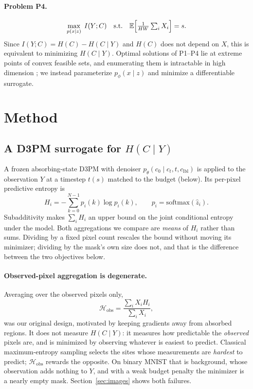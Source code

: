 \documentclass{article}
\begin{document}
\paragraph{Problem P4.}
\begin{equation}
\max_{p(x \mid z)} \; I(Y; C) \quad \text{s.t.} \quad \mathbb{E}\Bigl[\tfrac{1}{HW}\textstyle\sum_i X_i\Bigr] = s.
\label{eq:p4}
\end{equation}
Since $I(Y;C) = H(C) - H(C \mid Y)$ and $H(C)$ does not depend on $X$, this is equivalent to minimizing $H(C \mid Y)$. Optimal solutions of P1--P4 lie at extreme points of convex feasible sets, and enumerating them is intractable in high dimension \citep{vuong2025cnc}; we instead parameterize $p_\phi(x \mid z)$ and minimize a differentiable surrogate.

\section{Method}
\label{sec:method}

\subsection{A D3PM surrogate for $H(C \mid Y)$}
A frozen absorbing-state D3PM with denoiser $p_\theta(c_0 \mid c_t, t, c_{\mathrm{lbl}})$ is applied to the observation $Y$ at a timestep $t(s)$ matched to the budget (below). Its per-pixel predictive entropy is
\begin{equation}
H_i = -\sum_{k=0}^{N-1} p_i(k) \log p_i(k), \qquad p_i = \mathrm{softmax}(\hat{z}_i).
\end{equation}
Subadditivity makes $\sum_i H_i$ an upper bound on the joint conditional entropy under the model. Both aggregations we compare are \emph{means} of $H_i$ rather than sums. Dividing by a fixed pixel count rescales the bound without moving its minimizer; dividing by the mask's own size does not, and that is the difference between the two objectives below.

\paragraph{Observed-pixel aggregation is degenerate.}
Averaging over the observed pixels only,
\begin{equation}
\mathcal{H}_{\mathrm{obs}} = \frac{\sum_i X_i H_i}{\sum_i X_i},
\end{equation}
was our original design, motivated by keeping gradients away from absorbed regions. It does not measure $H(C \mid Y)$: it measures how predictable the \emph{observed} pixels are, and is minimized by observing whatever is easiest to predict. Classical maximum-entropy sampling \citep{shewry1987maxent,sebastiani2000maxent} selects the sites whose measurements are \emph{hardest} to predict; $\mathcal{H}_{\mathrm{obs}}$ rewards the opposite. On binary MNIST that is background, whose observation adds nothing to $Y$, and with a weak budget penalty the minimizer is a nearly empty mask. Section~\ref{sec:images} shows both failures.
\end{document}
